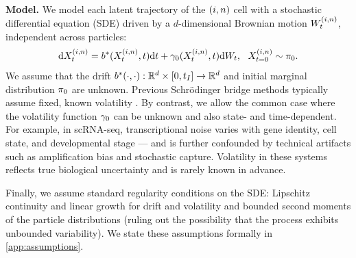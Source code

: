 \textbf{Model.} We model each latent trajectory of the $(i, n)$ cell with a stochastic differential equation (SDE) driven by a $d$-dimensional Brownian motion $\brownianm^{ (\timeidx,\sampleidx) }$, independent across particles:
\begin{equation}
    \de\responseat{\timet}^{ (\timeidx,\sampleidx) } = \truedrift(\responseat{\timet}^{ (\timeidx,\sampleidx) },t) \de\timet + \truevolatility(\responseat{\timet}^{ (\timeidx,\sampleidx) },\timet) \de\brownianm,~~\responseat{\timet = 0}^{ (\timeidx,\sampleidx) }\sim \marginal{0}.
    \label{eq:mainsde}
\end{equation}
We assume that the drift $\truedrift(\cdot,\cdot): \R^{d}\times [0,\timet_{\totsteps}] \to \R^{d}$ and initial marginal distribution $\pi_{0}$ are unknown. 
Previous Schrödinger bridge methods typically assume fixed, known volatility \citep[e.g.][]{de2021diffusion,Vargas2021,koshizuka2022neural,Wang2023,shen2024multi,zhang2024joint,guan2024identifying,chen2024deep}. By contrast, we allow the common case where the volatility function $\gamma_{0}$ can be unknown and also state- and time-dependent.
For example, in scRNA-seq, transcriptional noise varies with gene identity, cell state, and developmental stage --- and is further confounded by technical artifacts such as amplification bias and stochastic capture. Volatility in these systems reflects true biological uncertainty and is rarely known in advance. 

Finally, we assume standard regularity conditions on the SDE: Lipschitz continuity and linear growth for drift and volatility \citep[to ensure existence of strong solutions to the SDE; see][Chapter 3, Theorem 3.1]{pavliotis2016stochastic} and bounded second moments of the particle distributions (ruling out the possibility that the process exhibits unbounded variability). We state these assumptions formally in \cref{app:assumptions}.

